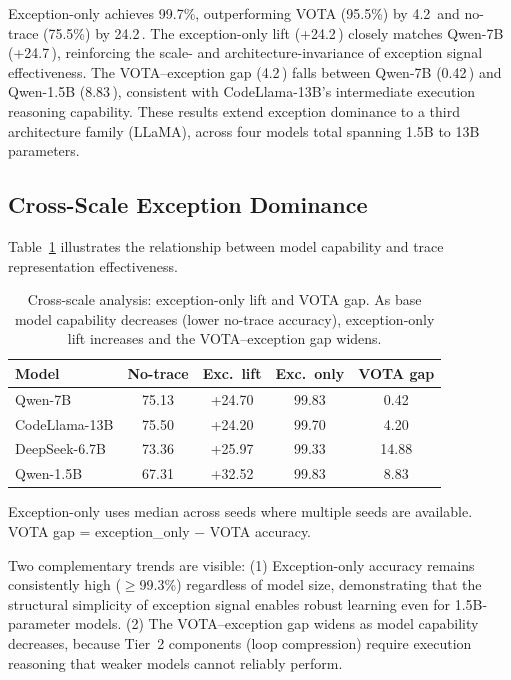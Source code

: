 \documentclass[11pt]{article}
\newcommand{\pp}{\,\text{pp}}
\begin{document}
Exception-only achieves 99.7\%, outperforming VOTA (95.5\%) by 4.2\pp{} and no-trace (75.5\%) by 24.2\pp.
The exception-only lift (+24.2\pp) closely matches Qwen-7B (+24.7\pp), reinforcing the scale- and architecture-invariance of exception signal effectiveness.
The VOTA--exception gap (4.2\pp) falls between Qwen-7B (0.42\pp) and Qwen-1.5B (8.83\pp), consistent with CodeLlama-13B's intermediate execution reasoning capability.
These results extend exception dominance to a third architecture family (LLaMA), across four models total spanning 1.5B to 13B parameters.


\subsection{Cross-Scale Exception Dominance}
\label{sec:cross_scale}

Table~\ref{tab:cross_scale_detail} illustrates the relationship between model capability and trace representation effectiveness.

\begin{table}[t]
\centering
\small
\caption{Cross-scale analysis: exception-only lift and VOTA gap. As base model capability decreases (lower no-trace accuracy), exception-only lift increases and the VOTA--exception gap widens.}
\label{tab:cross_scale_detail}
\begin{tabular}{@{}lcccc@{}}
\toprule
\textbf{Model} & \textbf{No-trace} & \textbf{Exc.\ lift} & \textbf{Exc.\ only} & \textbf{VOTA gap} \\
\midrule
Qwen-7B      & 75.13 & +24.70 & 99.83 & 0.42 \\
CodeLlama-13B & 75.50 & +24.20 & 99.70 & 4.20 \\
DeepSeek-6.7B & 73.36 & +25.97 & 99.33 & 14.88 \\
Qwen-1.5B    & 67.31 & +32.52 & 99.83 & 8.83 \\
\bottomrule
\end{tabular}
\vspace{2pt}
\begin{flushleft}
\footnotesize
Exception-only uses median across seeds where multiple seeds are available. VOTA gap = exception\_only $-$ VOTA accuracy.
\end{flushleft}
\end{table}

Two complementary trends are visible:
(1) Exception-only accuracy remains consistently high ($\geq$99.3\%) regardless of model size, demonstrating that the structural simplicity of exception signal enables robust learning even for 1.5B-parameter models.
(2) The VOTA--exception gap widens as model capability decreases, because Tier~2 components (loop compression) require execution reasoning that weaker models cannot reliably perform.
\end{document}
